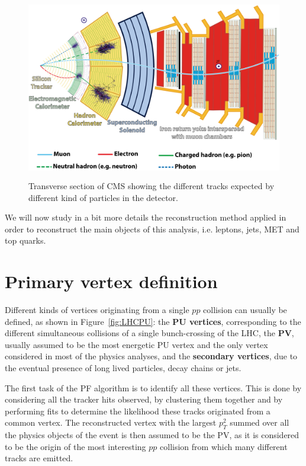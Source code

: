 \documentclass[a4paper, 10pt, openright]{report}
\begin{document}
\begin{figure}[htbp]
\begin{center}
\includegraphics[width=13cm, height=8cm]{figs/CMSIdentify.png}
\caption{Transverse section of \ac{CMS} showing the different tracks expected by different kind of particles in the detector.}
\label{fig:CMSIdentify}
\end{center}
\end{figure}

We will now study in a bit more details the reconstruction method applied in order to reconstruct the main objects of this analysis, i.e. leptons, jets, \ac{MET} and top quarks.

\section{Primary vertex definition} \label{section:PVDef}

Different kinds of vertices originating from a single $pp$ collision can usually be defined, as shown in Figure~\ref{fig:LHCPU}: the \textbf{\ac{PU} vertices}, corresponding to the different simultaneous collisions of a single bunch-crossing of the \ac{LHC}, the \textbf{\ac{PV}}, usually assumed to be the most energetic \ac{PU} vertex and the only vertex considered in most of the physics analyses, and the \textbf{secondary vertices}, due to the eventual presence of long lived particles, decay chains or jets. 

The first task of the \ac{PF} algorithm is to identify all these vertices. This is done by considering all the tracker hits observed, by clustering them together and by performing fits to determine the likelihood these tracks originated from a common vertex. The reconstructed vertex with the largest $p_T^2$ summed over all the physics objects of the event is then assumed to be the \ac{PV}, as it is considered to be the origin of the most interesting $pp$ collision from which many different tracks are emitted.
\end{document}
